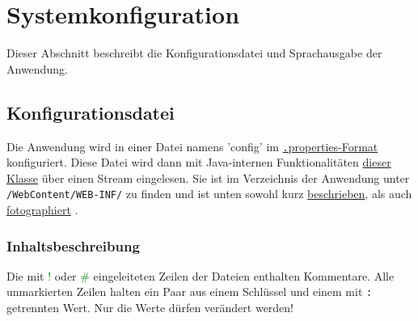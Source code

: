 \documentclass{article}
\begin{document}
\section{Systemkonfiguration}
Dieser Abschnitt beschreibt die Konfigurationsdatei und Sprachausgabe der Anwendung.
\subsection{Konfigurationsdatei}
\indent Die Anwendung wird in einer Datei namens 'config' im \hyperlink{https://de.wikipedia.org/wiki/Java-Properties-Datei}{{\texttt.properties}-Format} konfiguriert. Diese Datei wird dann mit Java-internen Funktionalitäten \hyperlink{https://docs.oracle.com/javase/7/docs/api/java/util/Properties.html}{dieser Klasse} über einen Stream eingelesen. Sie ist im Verzeichnis der Anwendung unter \texttt{/WebContent/WEB-INF/} zu finden und ist unten sowohl kurz \hyperlink{configTabelle}{beschrieben}, als auch \hyperlink{configFoto}{fotographiert} .
\subsubsection{Inhaltsbeschreibung}
\hypertarget{propSchema}{}
Die mit \textcolor{green}{!} oder \textcolor{green}{\#} eingeleiteten Zeilen der Dateien enthalten Kommentare. Alle unmarkierten Zeilen halten ein Paar aus einem Schlüssel und einem mit \texttt{:} getrennten Wert. Nur die Werte dürfen verändert werden!
\end{document}
